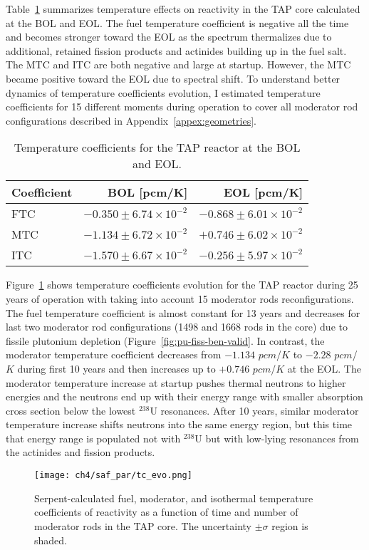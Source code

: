 Table~\ref{tab:tcoef} summarizes temperature effects on reactivity in the 
\gls{TAP} core calculated at the \gls{BOL} and \gls{EOL}. The fuel 
temperature coefficient is negative all the time and becomes stronger toward 
the \gls{EOL} as the spectrum thermalizes due to additional, retained fission 
products and actinides building up in the fuel salt. 
The MTC and ITC are both negative and large 
at startup. However, the MTC became positive toward the \gls{EOL} due to 
spectral shift. To understand better dynamics of temperature coefficients 
evolution, I estimated temperature coefficients for 15 different moments 
during operation to cover all moderator rod configurations described in 
Appendix~\ref{appex:geometries}.
\begin{table}[ht!]
	\caption{Temperature coefficients for the \gls{TAP} reactor at the 
	\gls{BOL} and \gls{EOL}.}
		\centering
	\begin{tabularx}{0.75\textwidth}{ X  r r } \hline
		\textbf{Coefficient} & \textbf{\gls{BOL} [pcm/K]} & \textbf{\gls{EOL} 
		[pcm/K]}                  \tabularnewline 
		[5pt] \hline
		FTC & $-0.350\pm6.74\times10^{-2}$ & $-0.868\pm6.01\times10^{-2}$ 
		\tabularnewline [3pt] \hline
		MTC & $-1.134\pm6.72\times10^{-2}$ & $+0.746\pm6.02\times10^{-2}$  
		\tabularnewline [3pt] \hline
		ITC & $-1.570\pm6.67\times10^{-2}$ & $-0.256\pm5.97\times10^{-2}$  
		\tabularnewline [3pt] \hline
	\end{tabularx}
	\label{tab:tcoef}
\end{table}

Figure~\ref{fig:tc-evo} shows temperature coefficients evolution for the 
\gls{TAP} reactor during 25 years of operation with taking into account 15 
moderator rods reconfigurations. The fuel temperature coefficient is almost 
constant for 13 years and decreases for last two moderator rod configurations 
(1498 and 1668 rods in the core) due to fissile plutonium depletion 
(Figure~\ref{fig:pu-fiss-ben-valid}. In contrast, the moderator temperature 
coefficient decreases from $-1.134$ $pcm$/$K$ to $-2.28$ $pcm$/$K$ during 
first 10 years and then increases up to $+0.746$ $pcm$/$K$ at the \gls{EOL}. 
The moderator temperature increase at startup pushes thermal neutrons to 
higher energies and the neutrons end up with their energy range with smaller 
absorption cross section below the lowest $^{238}$U resonances. After 10 
years, similar moderator temperature increase shifts neutrons into the same 
energy region, but this time that energy range is populated not with $^{238}$U 
but with low-lying resonances from the actinides and fission products.
\begin{figure}[htp!] %
	\centering
	\texttt{[image: ch4/saf\_par/tc\_evo.png]}
	\vspace{-10mm}
	\caption{Serpent-calculated fuel, moderator, and isothermal temperature 
		coefficients of reactivity as a function of time and number of 
		moderator 
		rods in the \gls{TAP} core. The uncertainty $\pm\sigma$ region is 
		shaded.}
	\label{fig:tc-evo}
\end{figure}

